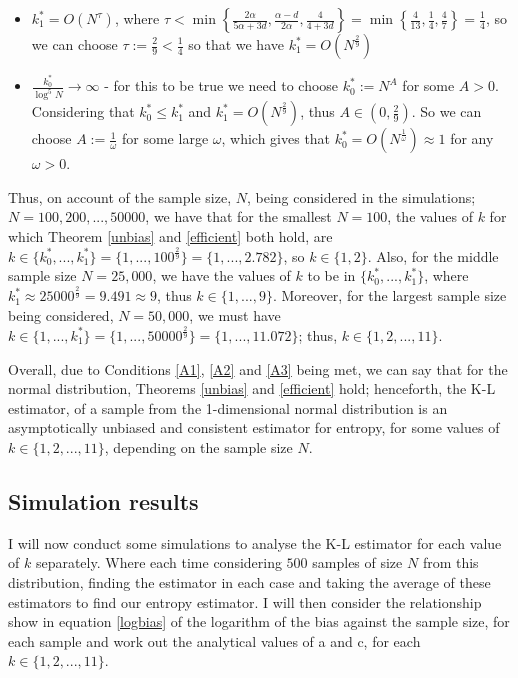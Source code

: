 \documentclass[12pt]{report}
\begin{document}
\begin{itemize}
\item $k_{1}^{*} = O(N^{\tau})$, where $\tau < \min \left\{ \frac{2 \alpha}{5 \alpha + 3d} , \frac{\alpha - d}{2 \alpha} , \frac{4}{4 + 3d} \right\} = \min \left\{ \frac{4}{13}, \frac{1}{4}, \frac{4}{7} \right\} = \frac{1}{4}$, so we can choose $\tau := \frac{2}{9} < \frac{1}{4}$ so that we have $k_{1}^{*} = O(N^{\frac{2}{9}})$

\item $\frac{k_{0}^{*}}{\log^{5}{N}} \to \infty$ - for this to be true we need to choose $k_{0}^{*} := N^A$ for some $A>0$. Considering that $k_{0}^{*} \leq k_{1}^{*}$ and $ k_{1}^{*} = O(N^{\frac{2}{9}})$, thus $A \in (0, \frac{2}{9})$. So we can choose $A := \frac{1}{\omega}$ for some large $\omega$, which gives that $k_{0}^{*} = O(N^{\frac{1}{\omega}}) \approx 1$ for any $\omega >0$.
\end{itemize}

Thus, on account of the sample size, $N$, being considered in the simulations; $N=100, 200, ..., 50000$, we have that for the smallest $N=100$, the values of $k$ for which Theorem \ref{unbias} and \ref{efficient} both hold, are $k \in \{k_{0}^{*}, ..., k_{1}^{*} \} = \{1, ... , 100^{\frac{2}{9}}\} = \{1, ..., 2.782\}$, so $k \in \{1, 2\}$. Also, for the middle sample size $N=25,000$, we have the values of $k$ to be in $\{k_{0}^{*}, ..., k_{1}^{*} \}$, where $ k_{1}^{*} \approx 25000^{\frac{2}{9}} = 9.491 \approx 9$, thus $k \in \{ 1, ..., 9\}$. Moreover, for the largest sample size being considered, $N=50,000$, we must have $k \in \{1, ..., k_{1}^{*} \} = \{1, ... , 50000^{\frac{2}{9}}\} = \{1, ..., 11.072\}$; thus, $k \in \{1, 2, ..., 11\}$.

Overall, due to Conditions \ref{A1}, \ref{A2} and \ref{A3} being met, we can say that for the normal distribution, Theorems \ref{unbias} and \ref{efficient} hold; henceforth, the K-L estimator, of a sample from the 1-dimensional normal distribution is an asymptotically unbiased and consistent estimator for entropy, for some values of $k \in \{1, 2, ..., 11\}$, depending on the sample size $N$. 


\subsection{Simulation results} \label{Normal_results}

I will now conduct some simulations to analyse the K-L estimator for each value of $k$ separately. Where each time considering $500$ samples of size $N$ from this distribution, finding the estimator in each case and taking the average of these estimators to find our entropy estimator. I will then consider the relationship show in equation \ref{logbias} of the logarithm of the bias against the sample size, for each sample and work out the analytical values of a and c, for each $k \in \{1, 2, ..., 11\}$. 
\end{document}
